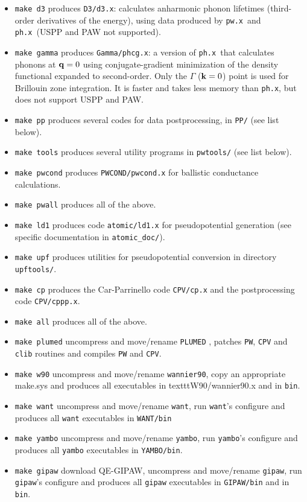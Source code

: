 \documentclass[12pt,a4paper]{article}
\def\pwx{\texttt{pw.x}}
\def\phx{\texttt{ph.x}}
\begin{document}
\begin{itemize}
\begin{itemize}
    using the IFC file calculated by \texttt{q2r.x}; may also calculate phonon DOS, 
    the electron-phonon coefficient $\lambda$, the function $\alpha^2F(\omega)$
\item \texttt{lambda.x}: also calculates $\lambda$ and $\alpha^2F(\omega)$,
   plus $T_c$ for  superconductivity using the McMillan formula
  \end{itemize}
\item \texttt{make d3} produces \texttt{D3/d3.x}:
  calculates anharmonic phonon lifetimes (third-order derivatives
  of the energy), using data produced by \pwx\ and \phx\ (USPP 
  and PAW not supported). 
\item \texttt{make gamma} produces \texttt{Gamma/phcg.x}: 
  a version of \phx\ that calculates phonons at ${\bf q} = 0$ using
  conjugate-gradient minimization of the density functional expanded to
  second-order. Only the $\Gamma$ (${\bf k} = 0$) point is used for Brillouin zone
  integration. It is faster and takes less memory than \phx, but does
  not support USPP and PAW.
\item  \texttt{make pp} produces several codes for data postprocessing, in 
  \texttt{PP/}  (see list below). 
\item \texttt{make tools} produces several utility programs in \texttt{pwtools/} (see
  list below).  
\item \texttt{make pwcond} produces \texttt{PWCOND/pwcond.x}
 for ballistic conductance calculations.
\item \texttt{make pwall} produces all of the above.
\item \texttt{make ld1} produces code \texttt{atomic/ld1.x} for pseudopotential
generation (see specific documentation in \texttt{atomic\_doc/}).
\item \texttt{make upf} produces utilities for pseudopotential conversion in
  directory \texttt{upftools/}.
\item \texttt{make cp} produces the Car-Parrinello code \texttt{CPV/cp.x}
  and the postprocessing code \texttt{CPV/cppp.x}. 
\item \texttt{make all} produces all of the above.
\item \texttt{make plumed} uncompress and move/rename \texttt{PLUMED} , patches \texttt{PW},
\texttt{CPV} and \texttt{clib} routines and compiles \texttt{PW} and \texttt{CPV}.
\item \texttt{make w90} uncompress and move/rename \texttt{wannier90}, copy an appropriate
make.sys and produces all executables in texttt{W90/wannier90.x} and in \texttt{bin}.
\item \texttt{make want} uncompress and move/rename \texttt{want}, run \texttt{want}'s configure
and produces all \texttt{want} executables in \texttt{WANT/bin}
\item \texttt{make yambo} uncompress and move/rename \texttt{yambo}, run \texttt{yambo}'s configure
and produces all \texttt{yambo} executables in \texttt{YAMBO/bin}.
\item \texttt{make gipaw} download QE-GIPAW, uncompress and move/rename \texttt{gipaw}, run \texttt{gipaw}'s configure
and produces all \texttt{gipaw} executables in \texttt{GIPAW/bin} and in \texttt{bin}.
\end{itemize}
\end{document}
